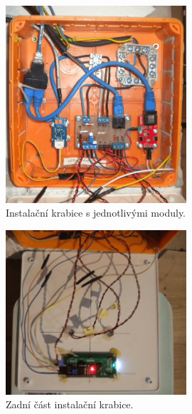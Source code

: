 \begin{figure}[H]
    \centering
    \includegraphics[width=0.6\textwidth]{images/krb/instalacni-krabice-vnitrek-krb.png}
    \caption{Instalační krabice s jednotlivými moduly.}
    \label{fig:instalacni-krabice-vnitrek-krb}
\end{figure}

\begin{figure}[H]
    \centering
    \includegraphics[width=0.6\textwidth]{images/krb/zadni-cast-krytu-vika-instalacni-krabice-krb.png}
    \caption{Zadní část instalační krabice.}
    \label{fig:zadni-cast-krytu-vika-instalacni-krabice-krb}
\end{figure}

